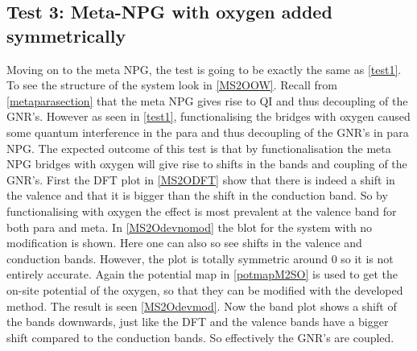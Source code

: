 \subsection{Test 3: Meta-NPG with oxygen added symmetrically}\label{test3}
Moving on to the meta NPG, the test is going to be exactly the same as \cref{test1}. To see the structure of the system look in \cref{MS2OOW}. Recall from \cref{metaparasection} that the meta NPG gives rise to QI and thus decoupling of the GNR's. However as seen in \cref{test1}, functionalising the bridges with oxygen caused some quantum interference in the para and thus decoupling of the GNR's in para NPG. The expected outcome of this test is that by functionalisation the meta NPG bridges with oxygen will give rise to shifts in the bands and coupling of the GNR's. First the DFT plot in \cref{MS2ODFT} show that there is indeed a shift in the valence and that it is bigger than the shift in the conduction band. So by functionalising with oxygen the effect is most prevalent at the valence band for both para and meta. In \cref{MS2Odevnomod} the blot for the system with no modification is shown. Here one can also so see shifts in the valence and conduction bands. However, the plot is totally symmetric around 0 so it is not entirely accurate. Again the potential map in \cref{potmapM2SO} is used to get the on-site potential of the oxygen, so that they can be modified with the developed method. The result is seen \cref{MS2Odevmod}. Now the band plot shows a shift of the bands downwards, just like the DFT and the valence bands have a bigger shift compared to the conduction bands. So effectively the GNR's are coupled.

